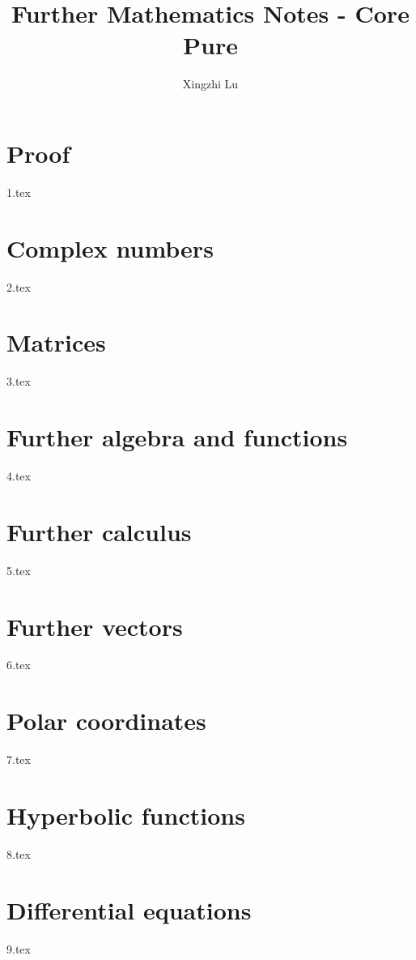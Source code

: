 \documentclass[A4paper]{article}
\title{Further Mathematics Notes - Core Pure}
\author{Xingzhi Lu}
\begin{document}
	\maketitle
	\tableofcontents
	\pagebreak
	\section{Proof} %
	{1.tex} \pagebreak
	
	\section{Complex numbers}
	{2.tex} \pagebreak
	
	\section{Matrices}
	{3.tex} \pagebreak
	
	\section{Further algebra and functions}
	{4.tex} \pagebreak
	
	\section{Further calculus}
	{5.tex} \pagebreak
	
	\section{Further vectors} %
	{6.tex} \pagebreak
	
	\section{Polar coordinates}
	{7.tex} \pagebreak
	
	\section{Hyperbolic functions}
	{8.tex} \pagebreak
	
	\section{Differential equations}
	{9.tex}

	
	
	\pagebreak
	
	
\end{document}
